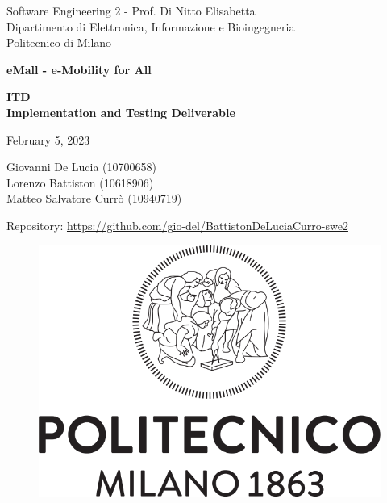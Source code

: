 \documentclass{article}
\begin{document}
\begin{titlepage}
  \centering
  {\normalsize
    Software Engineering 2 - Prof. Di Nitto Elisabetta \\
    Dipartimento di Elettronica, Informazione e Bioingegneria \\
    Politecnico di Milano \par
  }     \vspace{3cm}
  {\Huge \textbf{eMall - e-Mobility for All\\} } \vspace{1cm}
  {\large \textbf{ITD\\Implementation and Testing Deliverable} \par} \vspace{1cm}
  {\normalsize February 5, 2023 \par} \vspace{4cm}
  {\normalsize Giovanni De Lucia (10700658) \\ Lorenzo Battiston (10618906) \\  Matteo Salvatore Currò (10940719)\par} \vspace{0.5cm}
  {Repository: \url{https://github.com/gio-del/BattistonDeLuciaCurro-swe2}} \vspace{4cm}
  \begin{figure}[h]
    \centering
    \includegraphics[scale=0.3]{src/Logo_Politecnico_Milano.png}
  \end{figure} \vspace{0.5cm}
\end{titlepage}

\tableofcontents









\end{document}
